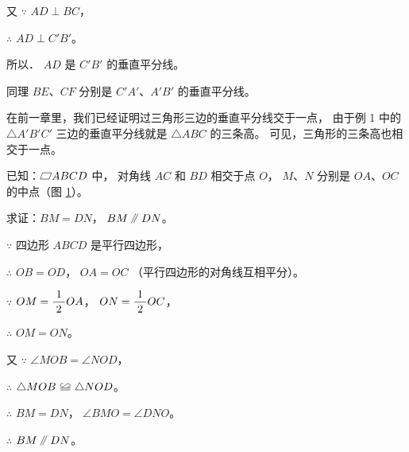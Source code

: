 又 $\because$ \quad $AD \perp BC$，

$\therefore$ \quad $AD \perp C'B'$。

所以． $AD$ 是 $C'B'$ 的垂直平分线。

同理 \quad $BE$、$CF$ 分别是 $C'A'$、$A'B'$ 的垂直平分线。


在前一章里，我们已经证明过三角形三边的垂直平分线交于一点，
由于例 1 中的 $\triangle A'B'C'$ 三边的垂直平分线就是 $\triangle ABC$ 的三条高。
可见，三角形的三条高也相交于一点。


\begin{figure}
    \centering
    
    \caption{}\label{fig:czjh1-4-16}
\end{figure}

\liti 已知：$\pxsbx ABCD$ 中， 对角线 $AC$ 和 $BD$ 相交于点 $O$，
$M$、$N$ 分别是 $OA$、$OC$ 的中点（图 \ref{fig:czjh1-4-16}）。

求证：$BM = DN$， $BM \pingxing DN$。

\zhengming $\because$ \quad 四边形 $ABCD$ 是平行四边形，

$\therefore$ \quad $OB = OD$， $OA = OC$ （平行四边形的对角线互相平分）。

\begin{enhancedline}
$\because$ \quad $OM = \dfrac{\; 1 \;}{2} OA$， $ON = \dfrac{\; 1 \;}{2} OC$，

$\therefore$ \quad $OM = ON$。
\end{enhancedline}

又 $\because$ \quad $\angle MOB = \angle NOD$，

$\therefore$ \quad $\triangle MOB \quandeng \triangle NOD$。

$\therefore$ \quad $BM = DN$， $\angle BMO = \angle DNO$。

$\therefore$ \quad $BM \pingxing DN$。


\begin{lianxi}




\end{lianxi}

